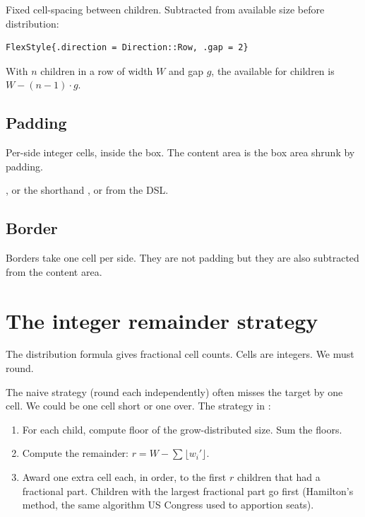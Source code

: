 Fixed cell-spacing between children. Subtracted from available
size before distribution:

\begin{lstlisting}
FlexStyle{.direction = Direction::Row, .gap = 2}
\end{lstlisting}

With $n$ children in a row of width $W$ and gap $g$, the
available for children is $W - (n-1) \cdot g$.

\subsection*{Padding}

Per-side integer cells, inside the box. The content area is the
box area shrunk by padding.

, or the
shorthand , or  from the
DSL.

\subsection*{Border}

Borders take one cell per side. They are not padding but they
are also subtracted from the content area.

\section{The integer remainder strategy}

The distribution formula gives fractional cell counts. Cells are
integers. We must round.

The naive strategy (round each independently) often misses the
target by one cell. We could be one cell short or one over. The
strategy in \maya{}:

\begin{enumerate}[leftmargin=*]
  \item For each child, compute floor of the grow-distributed
    size. Sum the floors.
  \item Compute the remainder: $r = W - \sum \lfloor w_i' \rfloor$.
  \item Award one extra cell each, in order, to the first $r$
    children that had a fractional part. Children with the
    largest fractional part go first (Hamilton's method, the
    same algorithm US Congress used to apportion seats).
\end{enumerate}

